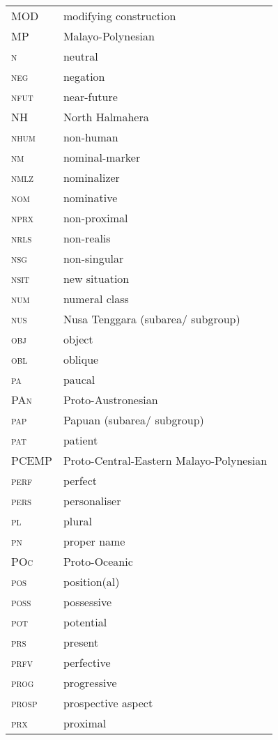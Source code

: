 \begin{longtable}{l l}
 \textsc{MOD}  & modifying construction \\
 \textsc{MP}  & Malayo-Polynesian \\
 \textsc{n}  & neutral \\
 \textsc{neg}  & negation \\
 \textsc{nfut}  & near-future \\
 \textsc{NH}  & North Halmahera \\
 \textsc{nhum}  & non-human \\
 \textsc{nm}  & nominal-marker \\
 \textsc{nmlz}  & nominalizer \\
 \textsc{nom}  & nominative \\
 \textsc{nprx}  & non-proximal \\
 \textsc{nrls}  & non-realis \\
 \textsc{nsg}  & non-singular \\
 \textsc{nsit}  & new situation \\
 \textsc{num}  & numeral class \\
 \textsc{nus}  & Nusa Tenggara (subarea/ subgroup) \\
 \textsc{obj}  & object \\
 \textsc{obl}  & oblique \\
 \textsc{pa}  & paucal \\
 \textsc{PAn} & Proto-Austronesian \\
 \textsc{pap}  & Papuan (subarea/ subgroup) \\
 \textsc{pat}  & patient \\
 \textsc{PCEMP} & Proto-Central-Eastern Malayo-Polynesian\\
 \textsc{perf}  & perfect \\
 \textsc{pers}  & personaliser \\
 \textsc{pl}  & plural \\
 \textsc{pn}  & proper name \\
 \textsc{POc} & Proto-Oceanic \\
 \textsc{pos}  & position(al) \\
 \textsc{poss}  & possessive \\
 \textsc{pot}  & potential \\
 \textsc{prs}  & present \\
 \textsc{prfv}  & perfective \\
 \textsc{prog}  & progressive \\
 \textsc{prosp}  & prospective aspect \\
 \textsc{prx}  & proximal \\

\end{longtable}
